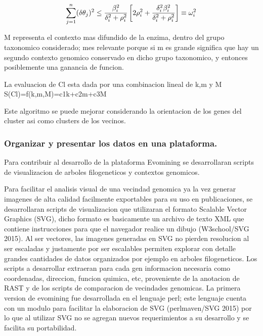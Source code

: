 \documentclass[12pt,twoside]{reedthesis}
\begin{document}
  \[\sum_{j=1}^n (\delta\theta_j)^2 \leq {{\beta_i^2}\over{\delta_i^2 + \rho_i^2}}
  \left[ 2\rho_i^2 + {\delta_i^2\beta_i^2\over{\delta_i^2 + \rho_i^2}} \right] \equiv \omega_i^2\]
  
  M representa el contexto mas difundido de la enzima, dentro del grupo
  taxonomico considerado; mes relevante porque si m es grande significa
  que hay un segundo contexto genomico conservado en dicho grupo
  taxonomico, y entonces posiblemente una ganancia de funcion.
  
  La evaluacion de Cl esta dada por una combinacion lineal de k,m y M\\
  S(Cl)=f(k,m,M)=c1k+c2m+c3M
  
  Este algoritmo se puede mejorar considerando la orientacion de los genes
  del cluster asi como clusters de los vecinos.
  
  \subsubsection{Organizar y presentar los datos en una
  plataforma.}\label{organizar-y-presentar-los-datos-en-una-plataforma.}
  
  Para contribuir al desarrollo de la plataforma Evomining se
  desarrollaran scripts de visualizacion de arboles filogeneticos y
  contextos genomicos.
  
  Para facilitar el analisis visual de una vecindad genomica ya la vez
  generar imagenes de alta calidad facilmente exportables para su uso en
  publicaciones, se desarrollaran scripts de visualizacion que utilizaran
  el formato Scalable Vector Graphics (SVG), dicho formato es basicamente
  un archivo de texto XML que contiene instrucciones para que el navegador
  realice un dibujo (W3school/SVG 2015). Al ser vectores, las imagenes
  generadas en SVG no pierden resolucion al ser escaladas y justamente por
  ser escalables permiten explorar con detalle grandes cantidades de datos
  organizados por ejemplo en arboles filogeneticos. Los scripts a
  desarrollar extraeran para cada gen informacion necesaria como
  coordenadas, direccion, funcion quimica, etc, proveniente de la
  anotacion de RAST y de los scripts de comparacion de vecindades
  genomicas. La primera version de evomining fue desarrollada en el
  lenguaje perl; este lenguaje cuenta con un modulo para facilitar la
  elaboracion de SVG (perlmaven/SVG 2015) por lo que al utilizar SVG no se
  agregan nuevos requerimientos a su desarrollo y se facilita su
  portabilidad.
  
\end{document}
